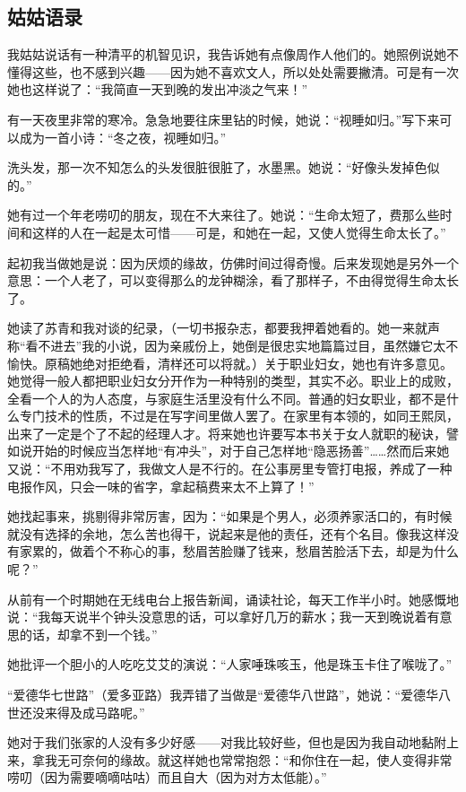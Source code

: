 \subsection{姑姑语录}

\par 我姑姑说话有一种清平的机智见识，我告诉她有点像周作人他们的。她照例说她不懂得这些，也不感到兴趣——因为她不喜欢文人，所以处处需要撇清。可是有一次她也这样说了：“我简直一天到晚的发出冲淡之气来！”
\par 有一天夜里非常的寒冷。急急地要往床里钻的时候，她说：“视睡如归。”写下来可以成为一首小诗：“冬之夜，视睡如归。”
\par 洗头发，那一次不知怎么的头发很脏很脏了，水墨黑。她说：“好像头发掉色似的。”
\par 她有过一个年老唠叨的朋友，现在不大来往了。她说：“生命太短了，费那么些时间和这样的人在一起是太可惜——可是，和她在一起，又使人觉得生命太长了。”
\par 起初我当做她是说：因为厌烦的缘故，仿佛时间过得奇慢。后来发现她是另外一个意思：一个人老了，可以变得那么的龙钟糊涂，看了那样子，不由得觉得生命太长了。
\par 她读了苏青和我对谈的纪录，（一切书报杂志，都要我押着她看的。她一来就声称“看不进去”我的小说，因为亲戚份上，她倒是很忠实地篇篇过目，虽然嫌它太不愉快。原稿她绝对拒绝看，清样还可以将就。）关于职业妇女，她也有许多意见。她觉得一般人都把职业妇女分开作为一种特别的类型，其实不必。职业上的成败，全看一个人的为人态度，与家庭生活里没有什么不同。普通的妇女职业，都不是什么专门技术的性质，不过是在写字间里做人罢了。在家里有本领的，如同王熙凤，出来了一定是个了不起的经理人才。将来她也许要写本书关于女人就职的秘诀，譬如说开始的时候应当怎样地“有冲头”，对于自己怎样地“隐恶扬善”……然而后来她又说：“不用劝我写了，我做文人是不行的。在公事房里专管打电报，养成了一种电报作风，只会一味的省字，拿起稿费来太不上算了！”
\par 她找起事来，挑剔得非常厉害，因为：“如果是个男人，必须养家活口的，有时候就没有选择的余地，怎么苦也得干，说起来是他的责任，还有个名目。像我这样没有家累的，做着个不称心的事，愁眉苦脸赚了钱来，愁眉苦脸活下去，却是为什么呢？”
\par 从前有一个时期她在无线电台上报告新闻，诵读社论，每天工作半小时。她感慨地说：“我每天说半个钟头没意思的话，可以拿好几万的薪水；我一天到晚说着有意思的话，却拿不到一个钱。”
\par 她批评一个胆小的人吃吃艾艾的演说：“人家唾珠咳玉，他是珠玉卡住了喉咙了。”
\par “爱德华七世路”（爱多亚路）我弄错了当做是“爱德华八世路”，她说：“爱德华八世还没来得及成马路呢。”
\par 她对于我们张家的人没有多少好感——对我比较好些，但也是因为我自动地黏附上来，拿我无可奈何的缘故。就这样她也常常抱怨：“和你住在一起，使人变得非常唠叨（因为需要嘀嘀咕咕）而且自大（因为对方太低能）。”
